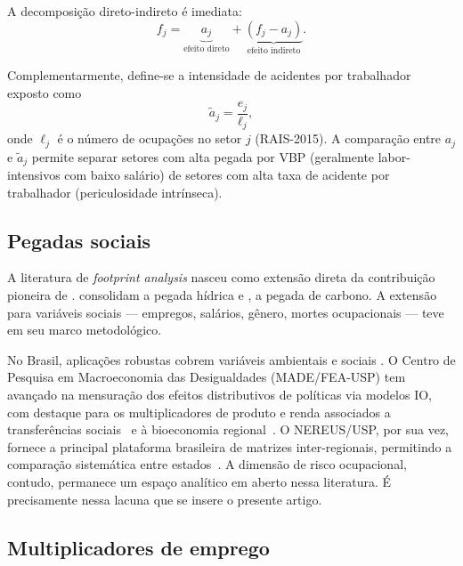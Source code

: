 \documentclass[12pt, a4paper]{article}
\begin{document}
A decomposição direto-indireto é imediata:
%
\begin{equation}
f_j = \underbrace{a_j}_{\text{efeito direto}}
    + \underbrace{(f_j - a_j)}_{\text{efeito indireto}}.
\label{eq:decomposicao}
\end{equation}

Complementarmente, define-se a intensidade de acidentes por trabalhador
exposto como
%
\begin{equation}
\tilde{a}_j = \frac{e_j}{\ell_j},
\label{eq:atilde}
\end{equation}
%
onde $\ell_j$ é o número de ocupações no setor $j$ (RAIS-2015). A
comparação entre $a_j$ e $\tilde{a}_j$ permite separar setores com alta
pegada por VBP (geralmente labor-intensivos com baixo salário) de setores
com alta taxa de acidente por trabalhador (periculosidade intrínseca).

\subsection{Pegadas sociais}

A literatura de \textit{footprint analysis} nasceu como extensão direta
da contribuição pioneira de \citet{leontief1970}. \citet{hoekstra2002virtual}
consolidam a pegada hídrica e \citet{hertwich2009carbon}, a pegada de
carbono. A extensão para variáveis sociais --- empregos, salários, gênero,
mortes ocupacionais --- teve em \citet{alsamawi2014employment} seu marco
metodológico.

No Brasil, aplicações robustas cobrem variáveis ambientais
\citep{carvalho2009intensidade,souza2016reducing} e sociais
\citep{perobelli2016decomposicao,made2021multiplicadores,guilhotosesso2010estimacao}.
O Centro de Pesquisa em Macroeconomia das Desigualdades
(MADE/FEA-USP) tem avançado na mensuração dos efeitos distributivos
de políticas via modelos IO, com destaque para os multiplicadores de
produto e renda associados a transferências sociais~\citep{made2021multiplicadores}
e à bioeconomia regional~\citep{made2023agroflorestais}.
O NEREUS/USP, por sua vez, fornece a principal plataforma brasileira
de matrizes inter-regionais, permitindo a comparação sistemática entre
estados~\citep{haddad2017iioas,nereus2024mips}.
A dimensão de risco ocupacional, contudo, permanece um espaço
analítico em aberto nessa literatura.
É precisamente nessa lacuna que se insere o presente artigo.

\subsection{Multiplicadores de emprego}
\end{document}
